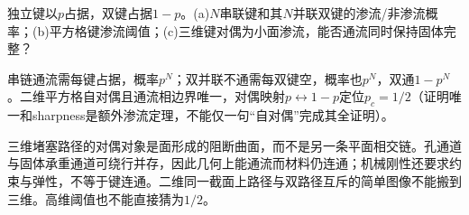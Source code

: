 \begin{exercise}[原题6(a)--(c)]\label{p:334-5-6}
独立键以$p$占据，双键占据$1-p$。(a)$N$串联键和其$N$并联双键的渗流/非渗流概率；(b)平方格键渗流阈值；(c)三维键对偶为小面渗流，能否通流同时保持固体完整？
\end{exercise}
\begin{solution}
串链通流需每键占据，概率$p^N$；双并联不通需每双键空，概率也$p^N$，双通$1-p^N$。二维平方格自对偶且通流相边界唯一，对偶映射$p\leftrightarrow1-p$定位$p_c=1/2$（证明唯一和sharpness是额外渗流定理，不能仅一句“自对偶”完成其全证明）。

三维堵塞路径的对偶对象是面形成的阻断曲面，而不是另一条平面相交链。孔通道与固体承重通道可绕行并存，因此几何上能通流而材料仍连通；机械刚性还要求约束与弹性，不等于键连通。二维同一截面上路径与双路径互斥的简单图像不能搬到三维。高维阈值也不能直接猜为$1/2$。
\end{solution}
